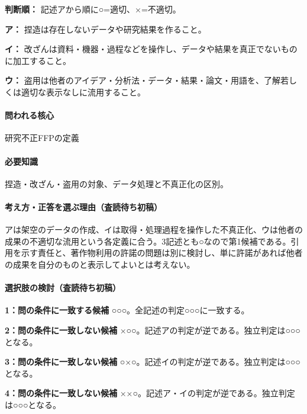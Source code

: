 \noindent\textbf{判断順：} 記述アから順に○=適切、×=不適切。\par

\noindent\textbf{ア：} 捏造は存在しないデータや研究結果を作ること。\par

\noindent\textbf{イ：} 改ざんは資料・機器・過程などを操作し、データや結果を真正でないものに加工すること。\par

\noindent\textbf{ウ：} 盗用は他者のアイデア・分析法・データ・結果・論文・用語を、了解若しくは適切な表示なしに流用すること。\par

\paragraph{問われる核心} 研究不正FFPの定義

\paragraph{必要知識} 捏造・改ざん・盗用の対象、データ処理と不真正化の区別。

\paragraph{考え方・正答を選ぶ理由（査読待ち初稿）} アは架空のデータの作成、イは取得・処理過程を操作した不真正化、ウは他者の成果の不適切な流用という各定義に合う。3記述とも○なので第1候補である。引用を示す責任と、著作物利用の許諾の問題は別に検討し、単に許諾があれば他者の成果を自分のものと表示してよいとは考えない。

\paragraph{選択肢の検討（査読待ち初稿）}\mbox{}\par

\noindent\textbf{1：問の条件に一致する候補} ○○○。全記述の判定○○○に一致する。\par

\noindent\textbf{2：問の条件に一致しない候補} ×○○。記述アの判定が逆である。独立判定は○○○となる。\par

\noindent\textbf{3：問の条件に一致しない候補} ○×○。記述イの判定が逆である。独立判定は○○○となる。\par

\noindent\textbf{4：問の条件に一致しない候補} ××○。記述ア・イの判定が逆である。独立判定は○○○となる。\par

